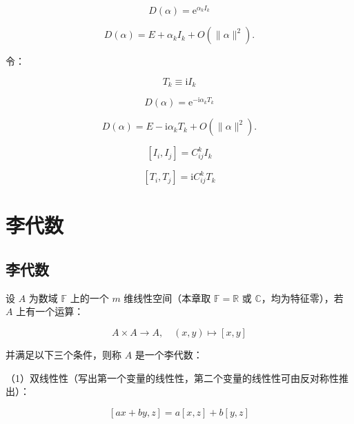 \begin{equation}
D\left(\alpha\right)
=\mathrm{e}^{\alpha_k I_k}
\end{equation}

\begin{equation}
D\left(\alpha\right)
=E+\alpha_kI_k+O\left(\lVert\alpha\rVert^2\right).
\end{equation}

令：

\begin{equation}
T_k
\equiv \mathrm{i}I_k
\end{equation}

\begin{equation}
D\left(\alpha\right)
=\mathrm{e}^{-\mathrm{i}\alpha_k T_k}
\end{equation}

\begin{equation}
D\left(\alpha\right)
=E-\mathrm{i}\alpha_kT_k+O\left(\lVert\alpha\rVert^2\right).
\end{equation}

\begin{equation}
\left[I_i,I_j \right] = C_{ij}^k I_k
\end{equation}

\begin{equation}
\left[T_i,T_j \right] = \mathrm{i}C_{ij}^k T_k
\end{equation}

\section{李代数}

\subsection{李代数}

设 $A$ 为数域 $\mathbb{F}$ 上的一个 $m$ 维线性空间（本章取 $\mathbb{F}=\mathbb{R}$ 或 $\mathbb{C}$，均为特征零），若 $A$ 上有一个运算：

\begin{equation}
A\times A\to A,\quad 
\left(x,y\right)\mapsto \left[x,y \right]
\end{equation}

并满足以下三个条件，则称 $A$ 是一个李代数：

（1）双线性性（写出第一个变量的线性性，第二个变量的线性性可由反对称性推出）：

\begin{equation}
\left[ax+by,z \right]
=a\left[x,z \right]+b\left[y,z \right]
\end{equation}

